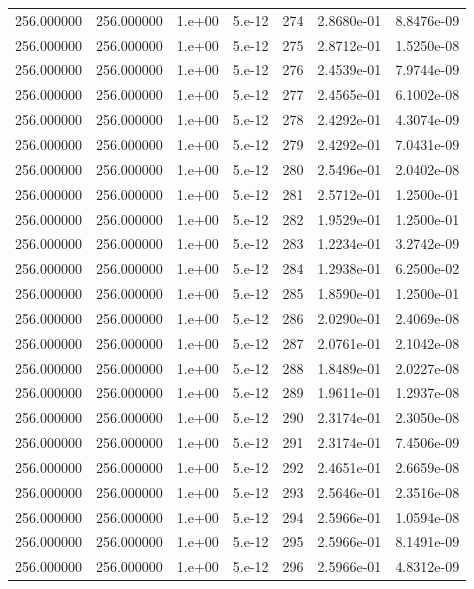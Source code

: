 \begin{table}[htbp]
\begin{tabular}{rrrrrrr}
256.000000 & 256.000000 & 1.e+00 & 5.e-12 & 274 & 2.8680e-01 & 8.8476e-09 \\
256.000000 & 256.000000 & 1.e+00 & 5.e-12 & 275 & 2.8712e-01 & 1.5250e-08 \\
256.000000 & 256.000000 & 1.e+00 & 5.e-12 & 276 & 2.4539e-01 & 7.9744e-09 \\
256.000000 & 256.000000 & 1.e+00 & 5.e-12 & 277 & 2.4565e-01 & 6.1002e-08 \\
256.000000 & 256.000000 & 1.e+00 & 5.e-12 & 278 & 2.4292e-01 & 4.3074e-09 \\
256.000000 & 256.000000 & 1.e+00 & 5.e-12 & 279 & 2.4292e-01 & 7.0431e-09 \\
256.000000 & 256.000000 & 1.e+00 & 5.e-12 & 280 & 2.5496e-01 & 2.0402e-08 \\
256.000000 & 256.000000 & 1.e+00 & 5.e-12 & 281 & 2.5712e-01 & 1.2500e-01 \\
256.000000 & 256.000000 & 1.e+00 & 5.e-12 & 282 & 1.9529e-01 & 1.2500e-01 \\
256.000000 & 256.000000 & 1.e+00 & 5.e-12 & 283 & 1.2234e-01 & 3.2742e-09 \\
256.000000 & 256.000000 & 1.e+00 & 5.e-12 & 284 & 1.2938e-01 & 6.2500e-02 \\
256.000000 & 256.000000 & 1.e+00 & 5.e-12 & 285 & 1.8590e-01 & 1.2500e-01 \\
256.000000 & 256.000000 & 1.e+00 & 5.e-12 & 286 & 2.0290e-01 & 2.4069e-08 \\
256.000000 & 256.000000 & 1.e+00 & 5.e-12 & 287 & 2.0761e-01 & 2.1042e-08 \\
256.000000 & 256.000000 & 1.e+00 & 5.e-12 & 288 & 1.8489e-01 & 2.0227e-08 \\
256.000000 & 256.000000 & 1.e+00 & 5.e-12 & 289 & 1.9611e-01 & 1.2937e-08 \\
256.000000 & 256.000000 & 1.e+00 & 5.e-12 & 290 & 2.3174e-01 & 2.3050e-08 \\
256.000000 & 256.000000 & 1.e+00 & 5.e-12 & 291 & 2.3174e-01 & 7.4506e-09 \\
256.000000 & 256.000000 & 1.e+00 & 5.e-12 & 292 & 2.4651e-01 & 2.6659e-08 \\
256.000000 & 256.000000 & 1.e+00 & 5.e-12 & 293 & 2.5646e-01 & 2.3516e-08 \\
256.000000 & 256.000000 & 1.e+00 & 5.e-12 & 294 & 2.5966e-01 & 1.0594e-08 \\
256.000000 & 256.000000 & 1.e+00 & 5.e-12 & 295 & 2.5966e-01 & 8.1491e-09 \\
256.000000 & 256.000000 & 1.e+00 & 5.e-12 & 296 & 2.5966e-01 & 4.8312e-09 \\

\end{tabular}
\end{table}
